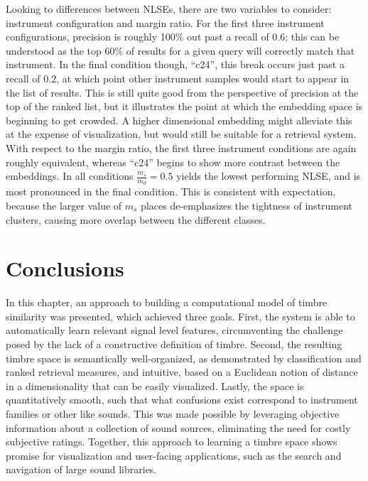 Looking to differences between NLSEs, there are two variables to consider: instrument configuration and margin ratio.
For the first three instrument configurations, precision is roughly 100\% out past a recall of 0.6;
this can be understood as the top 60\% of results for a given query will correctly match that instrument.
In the final condition though, ``c24'', this break occurs just past a recall of 0.2, at which point other instrument samples would start to appear in the list of results.
This is still quite good from the perspective of precision at the top of the ranked list, but it illustrates the point at which the embedding space is beginning to get crowded.
A higher dimensional embedding might alleviate this at the expense of visualization, but would still be suitable for a retrieval system.
With respect to the margin ratio, the first three instrument conditions are again roughly equivalent, whereas ``c24'' begins to show more contrast between the embeddings.
In all conditions $\frac{m_s}{m_d} = 0.5$ yields the lowest performing NLSE, and is most pronounced in the final condition.
This is consistent with expectation, because the larger value of $m_s$ places de-emphasizes the tightness of instrument clusters, causing more overlap between the different classes.


\section{Conclusions}
\label{sec:conclusions}

In this chapter, an approach to building a computational model of timbre similarity was presented, which achieved three goals.
First, the system is able to automatically learn relevant signal level features, circumventing the challenge posed by the lack of a constructive definition of timbre.
Second, the resulting timbre space is semantically well-organized, as demonstrated by classification and ranked retrieval measures, and intuitive, based on a Euclidean notion of distance in a dimensionality that can be easily visualized.
Lastly, the space is quantitatively smooth, such that what confusions exist correspond to instrument families or other like sounds.
This was made possible by leveraging objective information about a collection of sound sources, eliminating the need for costly subjective ratings.
Together, this approach to learning a timbre space shows promise for visualization and user-facing applications, such as the search and navigation of large sound libraries.

